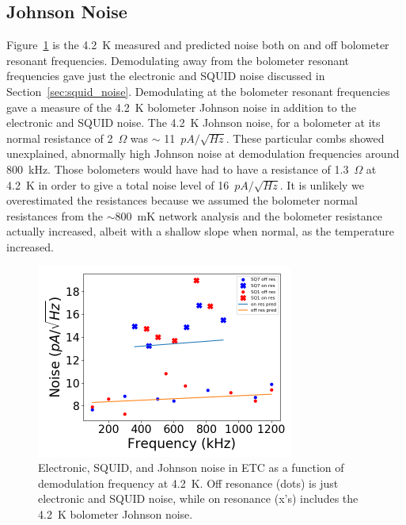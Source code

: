 \subsection{Johnson Noise}
\label{sec:johnson_noise}


Figure~\ref{fig:johnson_and_squid_noise} is the 4.2~K measured and predicted noise both on and off bolometer resonant frequencies. 
Demodulating away from the bolometer resonant frequencies gave just the electronic and \ac{SQUID} noise discussed in Section~\ref{sec:squid_noise}.
Demodulating at the bolometer resonant frequencies gave a measure of the 4.2~K bolometer Johnson noise in addition to the electronic and \ac{SQUID} noise. 
The 4.2~K Johnson noise, for a bolometer at its normal resistance of 2~$\Omega$ was $\sim$ 11~$pA/\sqrt{Hz}$.
These particular combs showed unexplained, abnormally high Johnson noise at demodulation frequencies around 800~kHz. 
Those bolometers would have had to have a resistance of 1.3~$\Omega$ at 4.2~K in order to give a total noise level of 16~$pA/\sqrt{Hz}$. 
It is unlikely we overestimated the resistances because we assumed the bolometer normal resistances from the $\sim$800~mK network analysis and the bolometer resistance actually increased, albeit with a shallow slope when normal, as the temperature increased. 


\begin{figure}[ht!]
\begin{center}
\includegraphics[height=2.5in]{figures/squid_plus_electronic_noise.png}
\caption{Electronic, \ac{SQUID}, and Johnson noise in \ac{ETC} as a function of demodulation frequency at 4.2~K. Off resonance (dots) is just electronic and \ac{SQUID} noise, while on resonance (x's) includes the 4.2~K bolometer Johnson noise. 
\label{fig:johnson_and_squid_noise} }
\end{center}
\end{figure}

